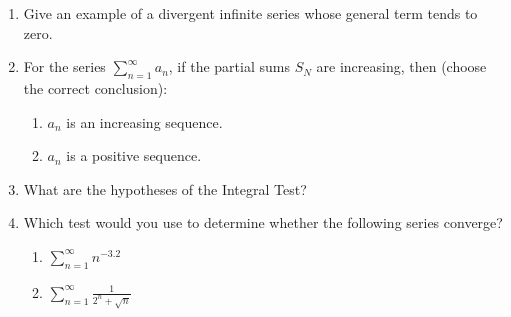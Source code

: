 \documentclass{nosvagor-notes}
\begin{document}
\begin{enumerate}
  \newpage

  \item Give an example of a divergent infinite series whose general term tends
    to zero.
    \vspace{90pt}

  \item For the series \(\displaystyle \sum_{n=1}^{\infty} a_n\), if the
    partial sums \(S_N\) are increasing, then (choose the correct conclusion):
    \begin{enumerate}
      \item \({a_n}\) is an increasing sequence.
      \item \({a_n}\) is a positive sequence.
    \end{enumerate}
  \vspace{60pt}

  \item What are the hypotheses of the Integral Test?
  \vspace{110pt}

  \item Which test would you use to determine whether the following series converge?
  \begin{enumerate}
    \item \(\displaystyle \sum_{n=1}^{\infty} n^{-3.2}\)
  \vspace{110pt}

    \item \(\displaystyle \sum_{n=1}^{\infty} \frac{1}{2^n + \sqrt{n} }\)
  \vspace{110pt}
  \end{enumerate}

\end{enumerate}
\end{document}
